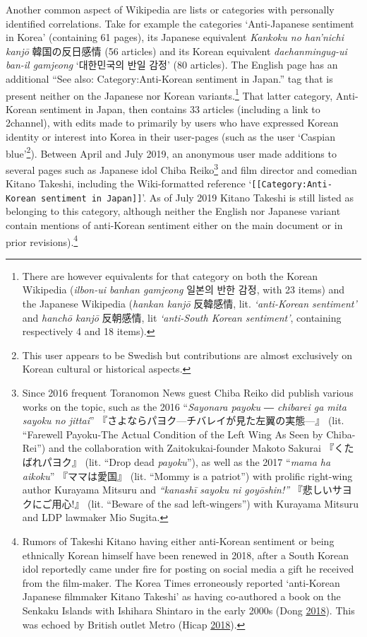 \documentclass[10pt,british,A4paper,,openany]{memoir}
\begin{document}
Another common aspect of Wikipedia are lists or categories with
personally identified correlations. Take for example the categories
`Anti-Japanese sentiment in Korea' (containing 61 pages), its Japanese
equivalent \emph{Kankoku no han'nichi kanjō} 韓国の反日感情 (56
articles) and its Korean equivalent \emph{daehanmingug-ui ban-il
gamjeong} `대한민국의 반일 감정' (80 articles). The English page has an
additional ``See also: Category:Anti-Korean sentiment in Japan.'' tag
that is present neither on the Japanese nor Korean variants.\footnote{There
  are however equivalents for that category on both the Korean Wikipedia
  (\emph{ilbon-ui banhan gamjeong} 일본의 반한 감정, with 23 items) and
  the Japanese Wikipedia (\emph{hankan kanjō} 反韓感情, lit.
  \emph{`anti-Korean sentiment'} and \emph{hanchō kanjō} 反朝感情, lit
  \emph{`anti-South Korean sentiment'}, containing respectively 4 and 18
  items).} That latter category, Anti-Korean sentiment in Japan, then
contains 33 articles (including a link to 2channel), with edits made to
primarily by users who have expressed Korean identity or interest into
Korea in their user-pages (such as the user `Caspian blue'\footnote{This
  user appears to be Swedish but contributions are almost exclusively on
  Korean cultural or historical aspects.}). Between April and July
2019‎, an anonymous user made additions to several pages such as
Japanese idol Chiba Reiko\footnote{Since 2016 frequent Toranomon News
  guest Chiba Reiko did publish various works on the topic, such as the
  2016 ``\emph{Sayonara payoku ― chibarei ga mita sayoku no jittai}''
  『さよならパヨク---チバレイが見た左翼の実態---』 (lit. ``Farewell
  Payoku-The Actual Condition of the Left Wing As Seen by Chiba-Rei'')
  and the collaboration with Zaitokukai-founder Makoto Sakurai
  『くたばれパヨク』 (lit. ``Drop dead \emph{payoku}''), as well as the
  2017 ``\emph{mama ha aikoku}'' 『ママは愛国』 (lit. ``Mommy is a
  patriot'') with prolific right-wing author Kurayama Mitsuru and
  \emph{``kanashī sayoku ni goyōshin!''} 『悲しいサヨクにご用心!』 (lit.
  ``Beware of the sad left-wingers'') with Kurayama Mitsuru and LDP
  lawmaker Mio Sugita.} and film director and comedian Kitano Takeshi,
including the Wiki-formatted reference
`\texttt{[[Category:Anti-Korean sentiment in Japan]]}'. As of July 2019
Kitano Takeshi is still listed as belonging to this category, although
neither the English nor Japanese variant contain mentions of anti-Korean
sentiment either on the main document or in prior revisions).\footnote{Rumors
  of Takeshi Kitano having either anti-Korean sentiment or being
  ethnically Korean himself have been renewed in 2018, after a South
  Korean idol reportedly came under fire for posting on social media a
  gift he received from the film-maker. The Korea Times erroneously
  reported `anti-Korean Japanese filmmaker Kitano Takeshi' as having
  co-authored a book on the Senkaku Islands with Ishihara Shintaro in
  the early 2000s (Dong \protect\hyperlink{ref-dong_ikon_2018}{2018}).
  This was echoed by British outlet Metro (Hicap
  \protect\hyperlink{ref-hicap_ikons_2018}{2018}).}
\end{document}
